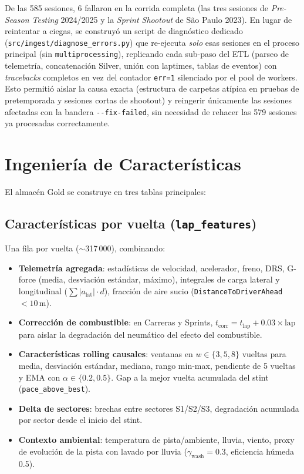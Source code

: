 \documentclass[conference]{IEEEtran}
\begin{document}
De las 585 sesiones, 6 fallaron en la corrida completa (las tres sesiones
de \emph{Pre-Season Testing} 2024/2025 y la \emph{Sprint Shootout} de
São Paulo 2023). En lugar de reintentar a ciegas, se construyó un script
de diagnóstico dedicado (\texttt{src/ingest/diagnose\_errors.py}) que
re-ejecuta \emph{solo} esas sesiones en el proceso principal (sin
\texttt{multiprocessing}), replicando cada sub-paso del ETL
(parseo de telemetría, concatenación Silver, unión con laptimes, tablas
de eventos) con \emph{tracebacks} completos en vez del contador \texttt{err=1}
silenciado por el pool de workers. Esto permitió aislar la causa exacta
(estructura de carpetas atípica en pruebas de pretemporada y sesiones
cortas de shootout) y reingerir únicamente las sesiones afectadas con
la bandera \texttt{-{}-fix-failed}, sin necesidad de rehacer las 579
sesiones ya procesadas correctamente.

\section{Ingeniería de Características}

El almacén Gold se construye en tres tablas principales:

\subsection{Características por vuelta (\texttt{lap\_features})}

Una fila por vuelta ($\sim$317\,000), combinando:

\begin{itemize}
  \item \textbf{Telemetría agregada}: estadísticas de velocidad, acelerador,
        freno, DRS, G-force (media, desviación estándar, máximo), integrales
        de carga lateral y longitudinal ($\sum |a_{\text{lat}}| \cdot d$),
        fracción de aire sucio (\texttt{DistanceToDriverAhead} $< 10$\,m).
  \item \textbf{Corrección de combustible}: en Carreras y Sprints,
        $t_{\text{corr}} = t_{\text{lap}} + 0.03 \times \text{lap}$ para
        aislar la degradación del neumático del efecto del combustible.
  \item \textbf{Características rolling causales}: ventanas en $w \in
        \{3, 5, 8\}$ vueltas para media, desviación estándar, mediana,
        rango min-max, pendiente de 5 vueltas y EMA con
        $\alpha \in \{0.2, 0.5\}$. Gap a la mejor vuelta acumulada
        del stint (\texttt{pace\_above\_best}).
  \item \textbf{Delta de sectores}: brechas entre sectores S1/S2/S3,
        degradación acumulada por sector desde el inicio del stint.
  \item \textbf{Contexto ambiental}: temperatura de pista/ambiente, lluvia,
        viento, proxy de evolución de la pista con lavado por lluvia
        ($\gamma_{\text{wash}} = 0.3$, eficiencia húmeda 0.5).
\end{itemize}
\end{document}
